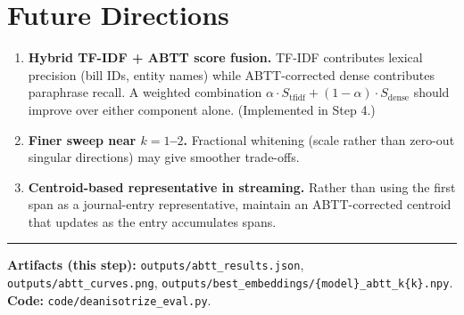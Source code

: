\documentclass[11pt,a4paper]{article}
\begin{document}
\section{Future Directions}

\begin{enumerate}[leftmargin=1.4em]
  \item \textbf{Hybrid TF-IDF + ABTT score fusion.}  TF-IDF contributes lexical precision
        (bill IDs, entity names) while ABTT-corrected dense contributes paraphrase recall.
        A weighted combination $\alpha \cdot S_\text{tfidf} + (1-\alpha) \cdot S_\text{dense}$
        should improve over either component alone.  (Implemented in Step 4.)
  \item \textbf{Finer sweep near $k=1$--$2$.}  Fractional whitening (scale rather than
        zero-out singular directions) may give smoother trade-offs.
  \item \textbf{Centroid-based representative in streaming.}  Rather than using the first
        span as a journal-entry representative, maintain an ABTT-corrected centroid that
        updates as the entry accumulates spans.
\end{enumerate}

\vspace{1.5em}
\hrule
\vspace{0.4em}
{\small
\textbf{Artifacts (this step):}
\texttt{outputs/abtt\_results.json},
\texttt{outputs/abtt\_curves.png},
\texttt{outputs/best\_embeddings/\{model\}\_abtt\_k\{k\}.npy}.\\
\textbf{Code:} \texttt{code/deanisotrize\_eval.py}.
}
\end{document}

